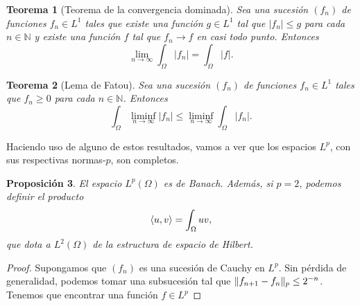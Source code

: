 \documentclass[12pt,a4paper]{book}
\DeclarePairedDelimiter\norm{\lVert}{\rVert}
\DeclarePairedDelimiter\esc{\langle}{\rangle}
\newtheorem{thm}{Teorema}[section]
\newtheorem{prop}[thm]{Proposición}
\theoremstyle{definition} \newtheorem{defn}[thm]{Definición}
\theoremstyle{definition} \newtheorem{ejemplo}[thm]{Ejemplo}
\theoremstyle{definition} \newtheorem{ejercicio}[thm]{Ejercicio}
\theoremstyle{remark} \newtheorem*{obs}{Observación}
\newcommand{\NN}{\mathbb{N}}
\begin{document}
\begin{thm}[Teorema de la convergencia dominada]
  Sea una sucesión $(f_n)$ de funciones $f_n \in L^1$ tales que existe una función $g\in L^1$ tal que $|f_n|\leq g $ para cada $n\in \NN$ y existe una función $f$ tal que $f_n \rightarrow f$ en casi todo punto. Entonces
  \begin{equation*}
    \lim_{n\rightarrow \infty} \int_\Omega |f_n| = \int_\Omega |f|.
  \end{equation*}
\end{thm}

\begin{thm}[Lema de Fatou]
  Sea una sucesión $(f_n)$ de funciones $f_n \in L^1$ tales que $f_n \geq 0$ para cada $n\in \NN$. Entonces 
  \begin{equation*}
  \int_\Omega \liminf_{n\rightarrow \infty} |f_n| \leq  \liminf_{n\rightarrow \infty}\int_\Omega  |f_n|. 
  \end{equation*}
\end{thm}

Haciendo uso de alguno de estos resultados, vamos a ver que los espacios $L^p$, con sus respectivas normas-$p$, son completos.

\begin{prop}
  El espacio $L^p(\Omega)$ es de Banach. Además, si $p=2$, podemos definir el producto
  \begin{equation*}
    \esc{u,v}=\int_{\Omega}uv,
  \end{equation*}
  que dota a $L^2(\Omega)$ de la estructura de espacio de Hilbert.
\end{prop}
\begin{proof}
  Supongamos que $(f_n)$ es una sucesión de Cauchy en $L^p$. Sin pérdida de generalidad, podemos tomar una subsucesión tal que $\norm{f_{n+1}-f_n}_p\leq 2^{-n}$. Tenemos que encontrar una función $f\in L^p$
\end{proof}
  
\end{document}
